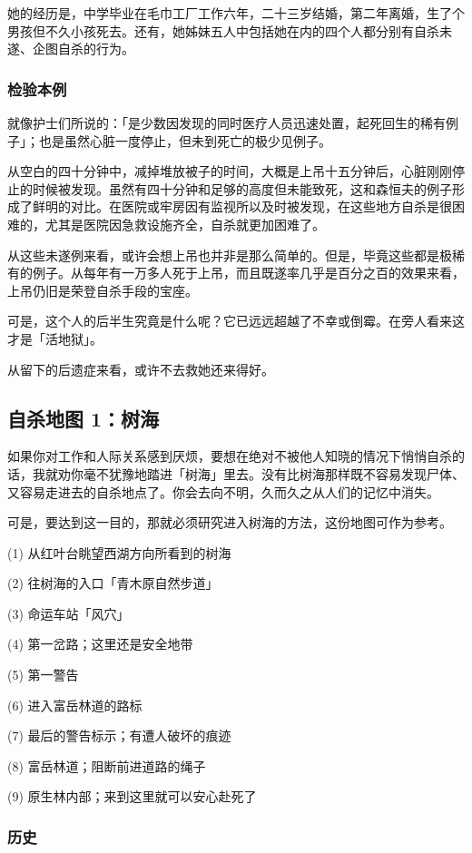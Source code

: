 \documentclass[UTF8]{ctexart}
\begin{document}
她的经历是，中学毕业在毛巾工厂工作六年，二十三岁结婚，第二年离婚，生了个男孩但不久小孩死去。还有，她姊妹五人中包括她在内的四个人都分别有自杀未遂、企图自杀的行为。

\subsubsection*{检验本例}

就像护士们所说的：「是少数因发现的同时医疗人员迅速处置，起死回生的稀有例子」；也是虽然心脏一度停止，但未到死亡的极少见例子。

从空白的四十分钟中，减掉堆放被子的时间，大概是上吊十五分钟后，心脏刚刚停止的时候被发现。虽然有四十分钟和足够的高度但未能致死，这和森恒夫的例子形成了鲜明的对比。在医院或牢房因有监视所以及时被发现，在这些地方自杀是很困难的，尤其是医院因急救设施齐全，自杀就更加困难了。

从这些未遂例来看，或许会想上吊也并非是那么简单的。但是，毕竟这些都是极稀有的例子。从每年有一万多人死于上吊，而且既遂率几乎是百分之百的效果来看，上吊仍旧是荣登自杀手段的宝座。

可是，这个人的后半生究竟是什么呢？它已远远超越了不幸或倒霉。在旁人看来这才是「活地狱」。

从留下的后遗症来看，或许不去救她还来得好。

\subsection{自杀地图 1：树海}

如果你对工作和人际关系感到厌烦，要想在绝对不被他人知晓的情况下悄悄自杀的话，我就劝你毫不犹豫地踏进「树海」里去。没有比树海那样既不容易发现尸体、又容易走进去的自杀地点了。你会去向不明，久而久之从人们的记忆中消失。

可是，要达到这一目的，那就必须研究进入树海的方法，这份地图可作为参考。

(1) 从红叶台眺望西湖方向所看到的树海

(2) 往树海的入口「青木原自然步道」

(3) 命运车站「风穴」

(4) 第一岔路；这里还是安全地带

(5) 第一警告

(6) 进入富岳林道的路标

(7) 最后的警告标示；有遭人破坏的痕迹

(8) 富岳林道；阻断前进道路的绳子

(9) 原生林内部；来到这里就可以安心赴死了

\subsubsection*{历史}
\end{document}
